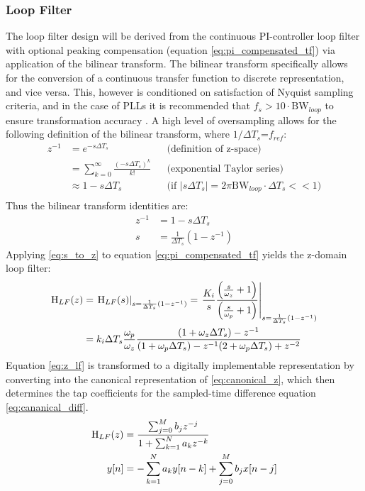 \subsubsection{Loop Filter}
	The loop filter design will be derived from the continuous PI-controller loop filter with optional peaking compensation (equation \ref{eq:pi_compensated_tf}) via application of the bilinear transform. The bilinear transform specifically allows for the conversion of a continuous transfer function to discrete representation, and vice versa. This, however is conditioned on satisfaction of Nyquist sampling criteria, and in the case of PLLs it is recommended that $f_s > 10\cdot\mathrm{BW}_{loop}$ to ensure transformation accuracy \cite{gardner_1980}. A high level of oversampling allows for the following definition of the bilinear transform, where $1/\Delta T_s$=$f_{ref}$:
	\begin{align*}
		z^{-1} &= e^{-s\Delta T_s} && \text{(definition of z-space)} \\
		&= \sum_{k=0}^\infty\frac{(-s\Delta T_s)^k}{k!} && \text{(exponential Taylor series)} \\
		&\approx 1-s\Delta T_s &&\text{(if $|s\Delta T_s| = 2\pi\mathrm{BW}_{loop}\cdot \Delta T_s << 1$)} \\
	\end{align*}
	Thus the bilinear transform identities are:
	\begin{align}
		z^{-1} &= 1-s\Delta T_s\\
		s &= \frac{1}{\Delta T_s}(1-z^{-1}) \label{eq:s_to_z}
	\end{align}
	Applying \ref{eq:s_to_z} to equation \ref{eq:pi_compensated_tf} yields the z-domain loop filter:
	\begin{align}
		\textnormal{H}_{LF}(z) &= \left.\textnormal{H}_{LF}(s)\right\vert_{s=\frac{1}{\Delta T_s}(1-z^{-1})} = \left.\frac{K_i}{s}\frac{\left(\frac{s}{\omega_z} + 1\right)}{\left(\frac{s}{\omega_p} + 1\right)}\right\vert_{s=\frac{1}{\Delta T_s}(1-z^{-1})}\\
		&= k_i\Delta T_s\frac{\omega_p}{\omega_z}\frac{(1+\omega_z\Delta T_s)-z^{-1}}{(1+\omega_p\Delta T_s) - z^{-1}(2+\omega_p\Delta T_s) + z^{-2}}\label{eq:z_lf}
	\end{align}
	Equation \ref{eq:z_lf} is transformed to a digitally implementable representation by converting into the canonical representation of \ref{eq:canonical_z}, which then determines the tap coefficients for the sampled-time difference equation \ref{eq:cananical_diff}. 
	\begin{align}
		\textnormal{H}_{LF}(z) &= \frac{\sum_{j=0}^M b_jz^{-j}}{1+\sum_{k=1}^N a_kz^{-k}}\label{eq:canonical_z} \\
		y[n]&= -\sum_{k=1}^N a_ky[n-k] + \sum_{j=0}^M b_jx[n-j] \label{eq:cananical_diff}
	\end{align}
